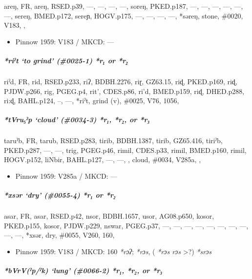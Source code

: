 \documentclass[a4paper,]{article}
\providecommand{\tightlist}{%
  \setlength{\itemsep}{0pt}\setlength{\parskip}{0pt}}
\let\oldsubparagraph\subparagraph
\renewcommand{\subparagraph}[1]{\oldsubparagraph{#1}\mbox{}}
\begin{document}
areŋ, FR, areŋ, RSED.p39, ---, ---, ---, ---, soreŋ, PKED.p187, ---,
---, ---, ---, ---, ---, sereŋ, BMED.p172, sereɲ, HOGV.p175, ---, ---,
---, ---, *səreŋ, stone, \#0020, V183, ,

\begin{itemize}
\tightlist
\item
  Pinnow 1959: V183 / MKCD: ---
\end{itemize}

\subparagraph{\texorpdfstring{\emph{*riˀt} `to grind' (\#0025-1)
\emph{*r₁} or
\emph{*r₂}}{*riˀt to grind (\#0025-1) *r₁ or *r₂}}\label{riux2c0t-to-grind-0025-1-r-or-r}

riˀd, FR, rid, RSED.p233, riʔ, BDBH.2276, riɽ, GZ63.15, riɖ, PKED.p169,
riɖ, PJDW.p266, rig, PGEG.p4, rit', CDES.p86, ri'd, BMED.p159, riɖ,
DHED.p288, ri:ɖ, BAHL.p124, --, ---, *riˀt, grind (v), \#0025, V76,
1056,

\subparagraph{\texorpdfstring{\emph{*tVru₅ˀp} `cloud' (\#0034-3)
\emph{*r₁}, \emph{*r₂}, or
\emph{*r₃}}{*tVru₅ˀp cloud (\#0034-3) *r₁, *r₂, or *r₃}}\label{tvruux2c0p-cloud-0034-3-r-r-or-r}

taruˀb, FR, tarub, RSED.p283, tirib, BDBH.1387, tirib, GZ65.416, tiriˀb,
PKED.p287, ---, ---, trig, PGEG.p46, rimil, CDES.p33, rimil, BMED.p160,
rimil, HOGV.p152, liNbir, BAHL.p127, ---, ---, , cloud, \#0034, V285a, ,

\begin{itemize}
\tightlist
\item
  Pinnow 1959: V285a / MKCD: ---
\end{itemize}

\subparagraph{\texorpdfstring{\emph{*xsər} `dry' (\#0055-4) \emph{*r₁}
or
\emph{*r₂}}{*xsər dry (\#0055-4) *r₁ or *r₂}}\label{xsux259r-dry-0055-4-r-or-r}

asar, FR, asar, RSED.p42, nsor, BDBH.1657, usor, AG08.p650, kosor,
PKED.p155, kosor, PJDW.p229, nswar, PGEG.p37, ---, ---, ---, ---, ---,
---, ---, ---, ---, ---, *xsər, dry, \#0055, V260, 160,

\begin{itemize}
\tightlist
\item
  Pinnow 1959: V183 / MKCD: 160 \emph{*rɔʔ}; \emph{*rɔs}, ( \emph{*rɔs
  rɔs} \textgreater{}?) \emph{*srɔs}
\end{itemize}

\subparagraph{\texorpdfstring{\emph{*bVrV(ˀp/ˀk)} `lung' (\#0066-2)
\emph{*r₁}, \emph{*r₂}, or
\emph{*r₃}}{*bVrV(ˀp/ˀk) lung (\#0066-2) *r₁, *r₂, or *r₃}}\label{bvrvux2c0pux2c0k-lung-0066-2-r-r-or-r}
\end{document}
